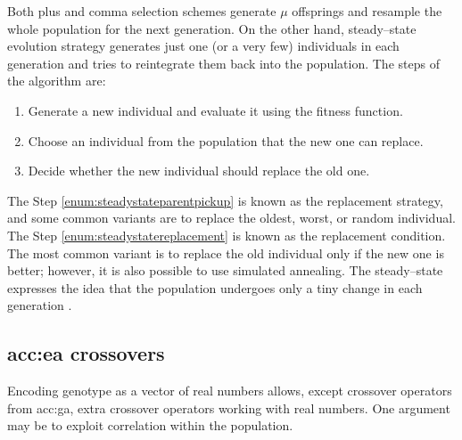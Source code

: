 Both plus and comma selection schemes generate $\mu$ offsprings and resample the whole population for the next generation. On the other hand, steady--state evolution strategy generates just one (or a very few) individuals in each generation and tries to reintegrate them back into the population. The steps of the algorithm are:
\begin{enumerate}
    \item Generate a new individual and evaluate it using the fitness function.
    \item\label{enum:steadystateparentpickup} Choose an individual from the population that the new one can replace.
    \item\label{enum:steadystatereplacement} Decide whether the new individual should replace the old one.
\end{enumerate}
The Step \ref{enum:steadystateparentpickup} is known as the replacement strategy, and some common variants are to replace the oldest, worst, or random individual. The Step \ref{enum:steadystatereplacement} is known as the replacement condition. The most common variant is to replace the old individual only if the new one is better; however, it is also possible to use simulated annealing.
The steady--state expresses the idea that the population undergoes only a tiny change in each generation \citep{SteadyStateEvolutionStrategy}.

\subsection{\texorpdfstring{\acrshort*{acc:ea} crossovers}{Crossovers}}

Encoding genotype as a vector of real numbers allows, except crossover operators from \acrshort{acc:ga}, extra crossover operators working with real numbers. One argument may be to exploit correlation within the population.

